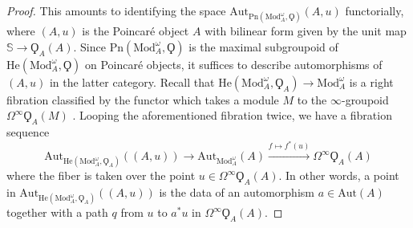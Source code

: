 \documentclass{article}
\theoremstyle{definition}
\begin{document}
\begin{proof}
	This amounts to identifying the space $\mathrm{Aut}_{\mathrm{Pn}\left(\mathrm{Mod}_A^\omega,\Qoppa\right)}(A,u)$ functorially, where $(A,u)$ is the Poincar{\'e} object $A$ with bilinear form given by the unit map $\mathbb{S}\to \Qoppa_A(A)$. 
    Since $ \mathrm{Pn}\left(\mathrm{Mod}_A^\omega,\Qoppa\right) $ is the maximal subgroupoid of $ \mathrm{He}\left(\mathrm{Mod}_A^\omega,\Qoppa\right) $ on Poincaré objects, it suffices to describe automorphisms of $ (A,u) $ in the latter category.
    Recall that $ \mathrm{He}(\mathrm{Mod}_A^\omega,\Qoppa_A)\to \mathrm{Mod}^\omega_A $ is a right fibration classified by the functor which takes a module $M$ to the $ \infty $-groupoid $ \Omega^\infty \Qoppa_A(M)$ \cite[Definition 2.1.1]{CDHHLMNNSI}. 
    Looping the aforementioned fibration twice, we have a fibration sequence %
    \begin{equation}\label{eq:loops_pnpic_fiber_sequence}
        \mathrm{Aut}_{\mathrm{He}(\mathrm{Mod}_A^\omega,\Qoppa_A)}((A,u)) \to \mathrm{Aut}_{\mathrm{Mod}_A^\omega}(A)\xrightarrow{f \mapsto f^*(u)} \Omega^\infty \Qoppa_A(A)
    \end{equation} 
    where the fiber is taken over the point $ u \in \Omega^\infty \Qoppa_A(A) $. 
    In other words, a point in $ \mathrm{Aut}_{\mathrm{He}(\mathrm{Mod}_A^\omega,\Qoppa_A)}((A,u)) $ is the data of an automorphism $a\in \mathrm{Aut}(A)$ together with a path $q $ from $ u $ to $ a^*u$ in $\Omega^{\infty}\Qoppa_A(A)$.  
	

\end{proof}
\end{document}
